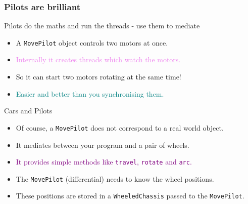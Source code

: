 \documentclass[color=pdftex,usenames,dvipsnames, aspectratio=169]{beamer}
\begin{document}
\begin{frame}
\frametitle{Pilots are brilliant}
\begin{block}{Pilots do the maths and run the threads - use them to mediate}
\begin{itemize}
 \item A \lstinline!MovePilot! object controls two motors at once.
 \item \textcolor{violet}{Internally it creates threads which watch the motors.}
 \item \textcolor{OliveGreen}{So it can start two motors rotating at the same time!}
 \item \textcolor{teal}{Easier and better than you synchronising them.}
\end{itemize}

\end{block}

\begin{block}{Cars and Pilots}
 \begin{itemize}
  \item Of course, a \lstinline!MovePilot! does not correspond to a real world object.
  \item \textcolor{OliveGreen}{It mediates between your program and a pair of wheels.}
  \item \textcolor{purple}{It provides simple methods like \lstinline!travel!, \lstinline!rotate! and \lstinline!arc!.}
\item The \lstinline!MovePilot! (differential) needs to know the wheel positions.
\item These positions are stored in a \lstinline!WheeledChassis! passed to the  \lstinline!MovePilot!. 
 \end{itemize}
\end{block}

\end{frame}
\end{document}
